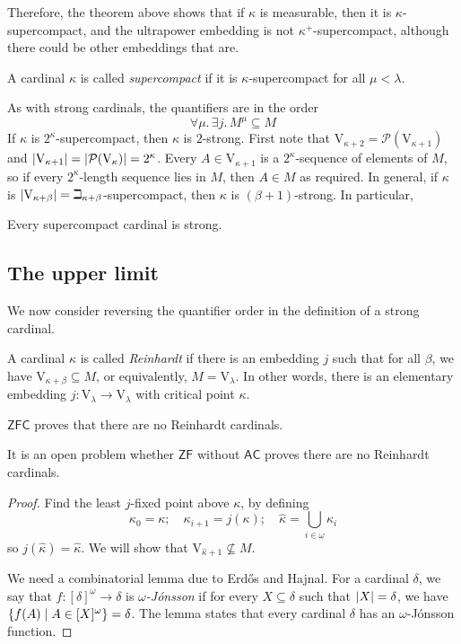Therefore, the theorem above shows that if \( \kappa \) is measurable, then it is \( \kappa \)-supercompact, and the ultrapower embedding is not \( \kappa^+ \)-supercompact, although there could be other embeddings that are.
\begin{definition}
    A cardinal \( \kappa \) is called \emph{supercompact} if it is \( \kappa \)-supercompact for all \( \mu < \lambda \).
\end{definition}
As with strong cardinals, the quantifiers are in the order
\[ \forall \mu.\, \exists j.\, M^\mu \subseteq M \]
If \( \kappa \) is \( 2^\kappa \)-supercompact, then \( \kappa \) is \( 2 \)-strong.
First note that \( \mathrm{V}_{\kappa + 2} = \mathcal P(\mathrm{V}_{\kappa + 1}) \) and \( \abs{\mathrm{V}_{\kappa + 1}} = \abs{\mathcal P(\mathrm{V}_\kappa)} = 2^\kappa \).
Every \( A \in \mathrm{V}_{\kappa + 1} \) is a \( 2^\kappa \)-sequence of elements of \( M \), so if every \( 2^\kappa \)-length sequence lies in \( M \), then \( A \in M \) as required.
In general, if \( \kappa \) is \( \abs{\mathrm{V}_{\kappa + \beta}} = \beth_{\kappa + \beta} \)-supercompact, then \( \kappa \) is \( (\beta + 1) \)-strong.
In particular,
\begin{corollary}
    Every supercompact cardinal is strong.
\end{corollary}

\subsection{The upper limit}
We now consider reversing the quantifier order in the definition of a strong cardinal.
\begin{definition}
    A cardinal \( \kappa \) is called \emph{Reinhardt} if there is an embedding \( j \) such that for all \( \beta \), we have \( \mathrm{V}_{\kappa + \beta} \subseteq M \), or equivalently, \( M = \mathrm{V}_\lambda \).
    In other words, there is an elementary embedding \( j : \mathrm{V}_\lambda \to \mathrm{V}_\lambda \) with critical point \( \kappa \).
\end{definition}
\begin{theorem}[Kunen]
    \( \mathsf{ZFC} \) proves that there are no Reinhardt cardinals.
\end{theorem}
It is an open problem whether \( \mathsf{ZF} \) without \( \mathsf{AC} \) proves there are no Reinhardt cardinals.
\begin{proof}
    Find the least \( j \)-fixed point above \( \kappa \), by defining
    \[ \kappa_0 = \kappa;\quad \kappa_{i + 1} = j(\kappa);\quad \hat \kappa = \bigcup_{i \in \omega} \kappa_i \]
    so \( j(\hat \kappa) = \hat \kappa \).
    We will show that \( \mathrm{V}_{\hat\kappa + 1} \nsubseteq M \).

    We need a combinatorial lemma due to Erd\H{o}s and Hajnal.
    For a cardinal \( \delta \), we say that \( f : [\delta]^\omega \to \delta \) is \emph{\( \omega \)-J\'onsson} if for every \( X \subseteq \delta \) such that \( \abs{X} = \delta \), we have \( \qty{f(A) \mid A \in [X]^\omega} = \delta \).
    The lemma states that every cardinal \( \delta \) has an \( \omega \)-J\'onsson function.
\end{proof}
